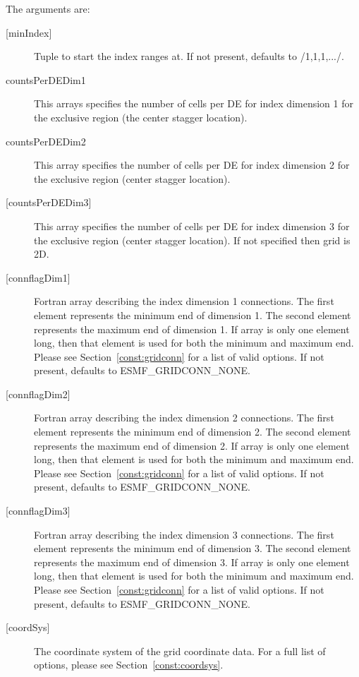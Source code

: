    The arguments are:
   \begin{description}
   \item[{[minIndex]}]
        Tuple to start the index ranges at. If not present, defaults
        to /1,1,1,.../.
   \item[countsPerDEDim1]
       This arrays specifies the number of cells per DE for index dimension 1
       for the exclusive region (the center stagger location).
   \item[countsPerDEDim2]
       This array specifies the number of cells per DE for index dimension 2
       for the exclusive region (center stagger location).
   \item[{[countsPerDEDim3]}]
       This array specifies the number of cells per DE for index dimension 3
       for the exclusive region (center stagger location).
       If not specified  then grid is 2D.
   \item[{[connflagDim1]}]
        Fortran array describing the index dimension 1 connections.
        The first element represents the minimum end of dimension 1.
        The second element represents the maximum end of dimension 1.
        If array is only one element long, then that element is used
        for both the minimum and maximum end.
        Please see Section~\ref{const:gridconn} for a list of valid
        options. If not present, defaults to ESMF\_GRIDCONN\_NONE.
   \item[{[connflagDim2]}]
        Fortran array describing the index dimension 2 connections.
        The first element represents the minimum end of dimension 2.
        The second element represents the maximum end of dimension 2.
        If array is only one element long, then that element is used
        for both the minimum and maximum end.
        Please see Section~\ref{const:gridconn} for a list of valid
        options. If not present, defaults to ESMF\_GRIDCONN\_NONE.
   \item[{[connflagDim3]}]
        Fortran array describing the index dimension 3 connections.
        The first element represents the minimum end of dimension 3.
        The second element represents the maximum end of dimension 3.
        If array is only one element long, then that element is used
        for both the minimum and maximum end.
        Please see Section~\ref{const:gridconn} for a list of valid
        options. If not present, defaults to ESMF\_GRIDCONN\_NONE.
   \item[{[coordSys]}]
       The coordinate system of the grid coordinate data.
       For a full list of options, please see Section~\ref{const:coordsys}.

\end{description}
